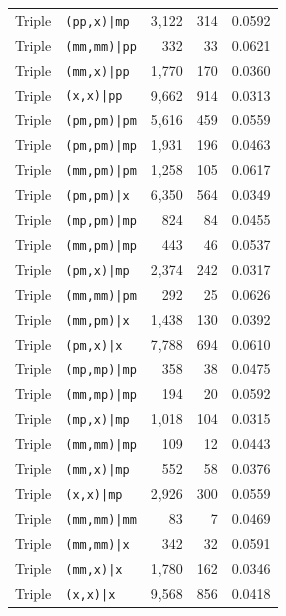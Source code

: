 \begin{longtable}{@{}llrrr@{}}
Triple & \texttt{(pp,x)|mp} & 3,122 & 314 & 0.0592 \\
Triple & \texttt{(mm,mm)|pp} & 332 & 33 & 0.0621 \\
Triple & \texttt{(mm,x)|pp} & 1,770 & 170 & 0.0360 \\
Triple & \texttt{(x,x)|pp} & 9,662 & 914 & 0.0313 \\
Triple & \texttt{(pm,pm)|pm} & 5,616 & 459 & 0.0559 \\
Triple & \texttt{(pm,pm)|mp} & 1,931 & 196 & 0.0463 \\
Triple & \texttt{(mm,pm)|pm} & 1,258 & 105 & 0.0617 \\
Triple & \texttt{(pm,pm)|x} & 6,350 & 564 & 0.0349 \\
Triple & \texttt{(mp,pm)|mp} & 824 & 84 & 0.0455 \\
Triple & \texttt{(mm,pm)|mp} & 443 & 46 & 0.0537 \\
Triple & \texttt{(pm,x)|mp} & 2,374 & 242 & 0.0317 \\
Triple & \texttt{(mm,mm)|pm} & 292 & 25 & 0.0626 \\
Triple & \texttt{(mm,pm)|x} & 1,438 & 130 & 0.0392 \\
Triple & \texttt{(pm,x)|x} & 7,788 & 694 & 0.0610 \\
Triple & \texttt{(mp,mp)|mp} & 358 & 38 & 0.0475 \\
Triple & \texttt{(mm,mp)|mp} & 194 & 20 & 0.0592 \\
Triple & \texttt{(mp,x)|mp} & 1,018 & 104 & 0.0315 \\
Triple & \texttt{(mm,mm)|mp} & 109 & 12 & 0.0443 \\
Triple & \texttt{(mm,x)|mp} & 552 & 58 & 0.0376 \\
Triple & \texttt{(x,x)|mp} & 2,926 & 300 & 0.0559 \\
Triple & \texttt{(mm,mm)|mm} & 83 & 7 & 0.0469 \\
Triple & \texttt{(mm,mm)|x} & 342 & 32 & 0.0591 \\
Triple & \texttt{(mm,x)|x} & 1,780 & 162 & 0.0346 \\
Triple & \texttt{(x,x)|x} & 9,568 & 856 & 0.0418 \\
\bottomrule
\end{longtable}

